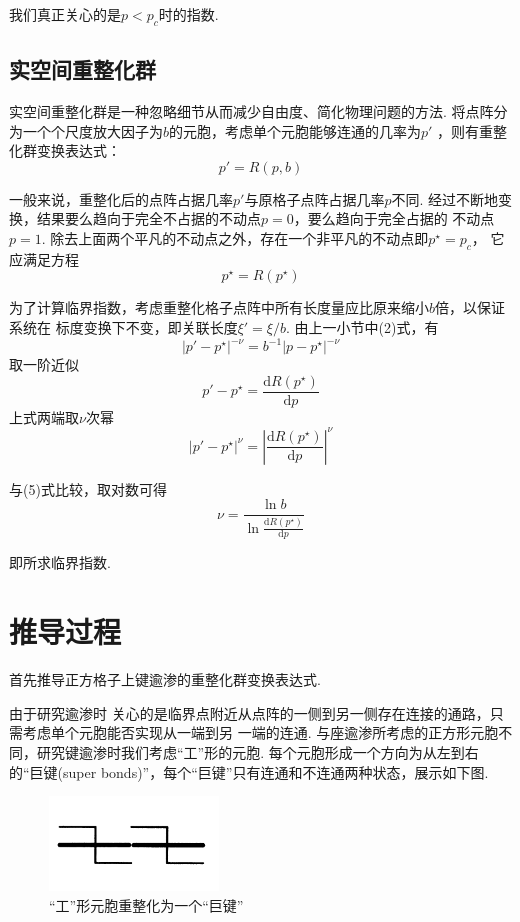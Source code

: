 \documentclass[12pt,a4paper,utf8]{ctexart}
\begin{document}
我们真正关心的是$p < p_c$时的指数.
\subsection{实空间重整化群}

实空间重整化群是一种忽略细节从而减少自由度、简化物理问题的方法.
将点阵分为一个个尺度放大因子为$b$的元胞，考虑单个元胞能够连通的几率为$p'$
，则有重整化群变换表达式：
\begin{equation}
    p' = R(p,b)
\end{equation}

一般来说，重整化后的点阵占据几率$p'$与原格子点阵占据几率$p$不同.
经过不断地变换，结果要么趋向于完全不占据的不动点$p=0$，要么趋向于完全占据的
不动点$p=1$. 除去上面两个平凡的不动点之外，存在一个非平凡的不动点即$p^{\star} =
p_c$， 它应满足方程
\begin{equation}
    p^{\star} = R(p^{\star})
\end{equation}

为了计算临界指数，考虑重整化格子点阵中所有长度量应比原来缩小$b$倍，以保证系统在
标度变换下不变，即关联长度$\xi' = \xi / b$. 由上一小节中(2)式，有
\begin{equation}
    |p'-p^{\star}|^{-\nu} = b^{-1} |p-p^{\star}|^{-\nu}
\end{equation}
取一阶近似
\begin{equation}    
    p' - p^{\star} = \frac{ \textrm{d}R(p^{\star})}{ \textrm{d}p}
\end{equation}
上式两端取$\nu$次幂
\begin{equation}
    |p' - p^{\star}|^{\nu} = \left | \frac{ \textrm{d}R(p^{\star})}{
    \textrm{d}p} \right | ^{\nu}
\end{equation}

与(5)式比较，取对数可得
\begin{equation}
    \nu = \frac{\ln b}{\ln  \frac{ \textrm{d}R(p^{\star})}{ \textrm{d}p}}
\end{equation}

即所求临界指数. 

\section{推导过程}

首先推导正方格子上键逾渗的重整化群变换表达式. 

由于研究逾渗时
关心的是临界点附近从点阵的一侧到另一侧存在连接的通路，只需考虑单个元胞能否实现从一端到另
一端的连通. 与座逾渗所考虑的正方形元胞不同，研究键逾渗时我们考虑“工”形的元胞.
每个元胞形成一个方向为从左到右的“巨键(super
bonds)”，每个“巨键”只有连通和不连通两种状态，展示如下图. 
\begin{figure}[!h]
    \centering
    \includegraphics[width=0.4\textwidth]{fig1.png}
    \caption{“工”形元胞重整化为一个“巨键”}
\end{figure}
\end{document}
